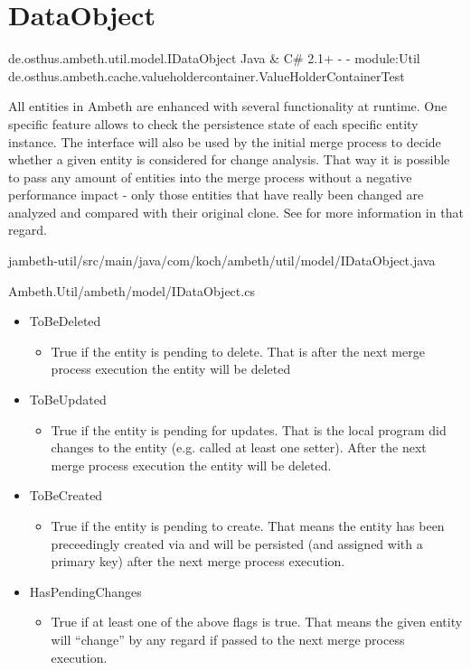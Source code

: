 \section{DataObject}
\label{feature:DataObject}
\ClearAPI
\TODO
\feature
	{de.osthus.ambeth.util.model.IDataObject}
	{Java \& C\#}
	{2.1+}
	{-}
	{-}
	{module:Util}
	{de.osthus.ambeth.cache.valueholdercontainer.ValueHolderContainerTest}

All entities in Ambeth are enhanced with several functionality at runtime. One specific feature allows to check the persistence state of each specific entity instance. The  interface will also be used by the initial merge process to decide whether a given entity is considered for change analysis. That way it is possible to pass any amount of entities into the merge process without a negative performance impact - only those entities that have really been changed are analyzed and compared with their original clone. See  for more information in that regard.

	{jambeth-util/src/main/java/com/koch/ambeth/util/model/IDataObject.java}

	{Ambeth.Util/ambeth/model/IDataObject.cs}

\begin{itemize}
	\item ToBeDeleted
		\begin{itemize}
			\item True if the entity is pending to delete. That is after the next merge process execution the entity will be deleted
		\end{itemize}
	\item ToBeUpdated
		\begin{itemize}
			\item True if the entity is pending for updates. That is the local program did changes to the entity (e.g. called at least one setter). After the next merge process execution the entity will be deleted.
		\end{itemize}
	\item ToBeCreated
		\begin{itemize}
			\item True if the entity is pending to create. That means the entity has been preceedingly created via  and will be persisted (and assigned with a primary key) after the next merge process execution.
		\end{itemize}
	\item HasPendingChanges
		\begin{itemize}
			\item True if at least one of the above flags is true. That means the given entity will ``change'' by any regard if passed to the next merge process execution.
		\end{itemize}
\end{itemize}